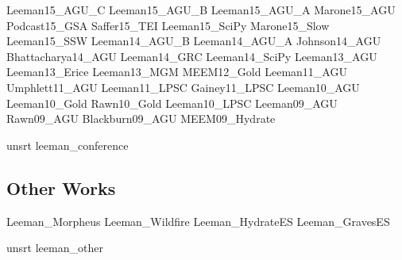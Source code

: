 \documentclass[letterpaper]{article}
\begin{document}
\begingroup
\renewcommand{\section}[2]{}

\nocite{conf}{Leeman15_AGU_C}
\nocite{conf}{Leeman15_AGU_B}
\nocite{conf}{Leeman15_AGU_A}
\nocite{conf}{Marone15_AGU}
\nocite{conf}{Podcast15_GSA}
\nocite{conf}{Saffer15_TEI}
\nocite{conf}{Leeman15_SciPy}
\nocite{conf}{Marone15_Slow}
\nocite{conf}{Leeman15_SSW}
\nocite{conf}{Leeman14_AGU_B}
\nocite{conf}{Leeman14_AGU_A}
\nocite{conf}{Johnson14_AGU}
\nocite{conf}{Bhattacharya14_AGU}
\nocite{conf}{Leeman14_GRC}
\nocite{conf}{Leeman14_SciPy}
\nocite{conf}{Leeman13_AGU}
\nocite{conf}{Leeman13_Erice}
\nocite{conf}{Leeman13_MGM}
\nocite{conf}{MEEM12_Gold}
\nocite{conf}{Leeman11_AGU}
\nocite{conf}{Umphlett11_AGU}
\nocite{conf}{Leeman11_LPSC}
\nocite{conf}{Gainey11_LPSC}
\nocite{conf}{Leeman10_AGU}
\nocite{conf}{Leeman10_Gold}
\nocite{conf}{Rawn10_Gold}
\nocite{conf}{Leeman10_LPSC}
\nocite{conf}{Leeman09_AGU}
\nocite{conf}{Rawn09_AGU}
\nocite{conf}{Blackburn09_AGU}
\nocite{conf}{MEEM09_Hydrate}


{unsrt}
{leeman_conference}{}
\endgroup

\subsection*{Other Works}

\begingroup
\renewcommand{\section}[2]{}


\nocite{other}{Leeman_Morpheus}
\nocite{other}{Leeman_Wildfire}
\nocite{other}{Leeman_HydrateES}
\nocite{other}{Leeman_GravesES}

{unsrt}
{leeman_other}{}
\endgroup

%
%
\end{document}
